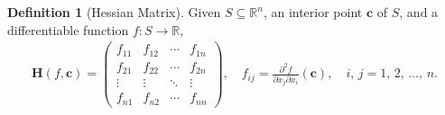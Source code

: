 \documentclass[10pt]{extarticle}
\newcommand{\ds}{\displaystyle}
\theoremstyle{definition}
\newtheorem*{dfn}{Definition}
\newcommand{\vc}{\mathbf{c}}
\newcommand{\vH}{\mathbf{H}}
\begin{document}
\newpage


\begin{dfn}[Hessian Matrix]
  Given $\ds S\subseteq\mathbb{R}^n$, an interior point $\vc$ of $S$, and a differentiable function $\ds f:S\to\mathbb{R}$, 
  \begin{align*}
    \vH(f, \vc) = \begin{pmatrix}f_{11} & f_{12} & \cdots & f_{1n} \\ f_{21} & f_{22} & \cdots & f_{2n} \\ \vdots & \vdots & \ddots & \vdots \\ f_{n1} & f_{n2} & \cdots & f_{nn}\end{pmatrix}, \quad f_{ij} = \frac{\partial^2 f}{\partial x_j\partial x_i}(\vc), \quad i,\,j = 1,\,2,\,\ldots,\,n.
  \end{align*}
\end{dfn}
\end{document}
